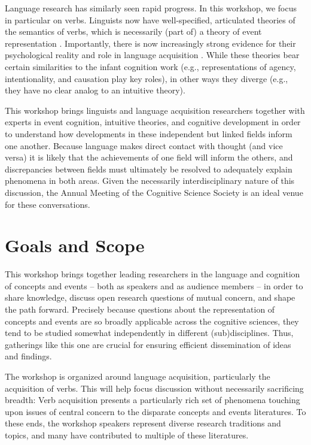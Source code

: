 \documentclass[10pt,letterpaper]{article}
\begin{document}
Language research has similarly seen rapid progress. In this workshop,
we focus in particular on verbs. Linguists now have well-specified,
articulated theories of the semantics of verbs, which is necessarily
(part of) a theory of event representation \cite{Levin2011,Levin2005}. Importantly, there is now increasingly strong evidence for their psychological reality and role in language acquisition
\cite{Ambridge2013,HOSULS}. While these theories bear certain
similarities to the infant cognition work (e.g., representations of
agency, intentionality, and causation play key roles), in other ways
they diverge (e.g., they have no clear analog to an intuitive theory).

This workshop brings linguists and language acquisition researchers
together with experts in event cognition, intuitive theories, and
cognitive development in order to understand how
developments in these independent but linked fields inform one
another. Because language makes direct contact with thought (and vice versa) it is likely that the achievements of one
field will inform the others, and discrepancies between fields must ultimately be resolved to adequately explain phenomena in both areas. Given
the necessarily interdisciplinary nature of this discussion, the Annual
Meeting of the Cognitive Science Society is an ideal venue for these conversations.

\section{Goals and Scope}

This workshop brings together leading researchers in the language and
cognition of concepts and events -- both as speakers and as audience
members -- in order to share knowledge, discuss open research
questions of mutual concern, and shape the path forward. Precisely
because questions about the representation of concepts and events are
so broadly applicable across the cognitive sciences, they tend to be
studied somewhat independently in different (sub)disciplines. Thus,
gatherings like this one are crucial for ensuring efficient
dissemination of ideas and findings.

The workshop is organized around language acquisition, particularly
the acquisition of verbs. This will help focus discussion without
necessarily sacrificing breadth: Verb acquisition presents a
particularly rich set of phenomena touching upon issues of central
concern to the disparate concepts and events literatures. To these ends, the workshop speakers represent diverse research
traditions and topics, and many have contributed to multiple of these literatures.
\end{document}
